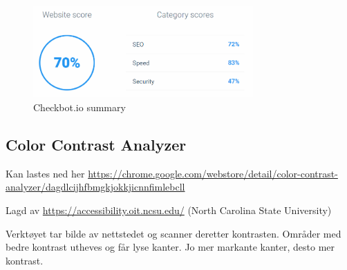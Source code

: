 \begin{figure}[H]
    \centering
    \includegraphics[width=0.75\textwidth]{bjornar/checkbotio-summary.png}
    \caption{Checkbot.io summary}
    \label{fig:analysis-current-checkbot-summary}
\end{figure}



\subsection{Color Contrast Analyzer}

Kan lastes ned her
\url{https://chrome.google.com/webstore/detail/color-contrast-analyzer/dagdlcijhfbmgkjokkjicnnfimlebcll}

Lagd av
\url{https://accessibility.oit.ncsu.edu/} (North Carolina State University)

Verktøyet tar bilde av nettstedet og scanner deretter kontrasten. Områder med bedre kontrast utheves og får lyse kanter. Jo mer markante kanter, desto mer kontrast.

